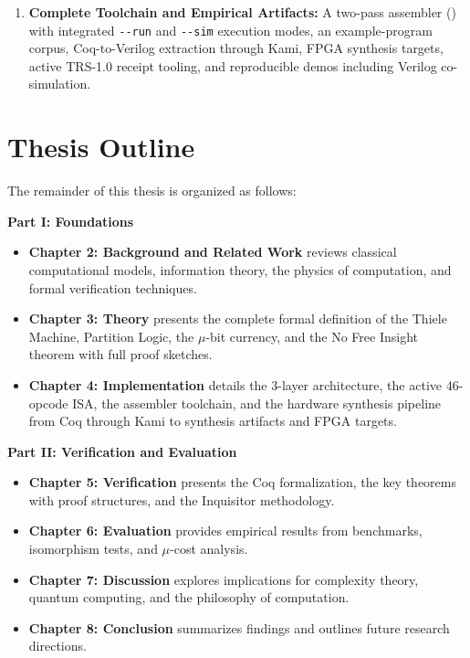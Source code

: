 \begin{enumerate}
    \item \textbf{Complete Toolchain and Empirical Artifacts:} A two-pass assembler () with integrated \texttt{-{}-run} and \texttt{-{}-sim} execution modes, an example-program corpus, Coq-to-Verilog extraction through Kami, FPGA synthesis targets, active TRS-1.0 receipt tooling, and reproducible demos including Verilog co-simulation.
\end{enumerate}

\section{Thesis Outline}

The remainder of this thesis is organized as follows:

\textbf{Part I: Foundations}
\begin{itemize}
    \item \textbf{Chapter 2: Background and Related Work} reviews classical computational models, information theory, the physics of computation, and formal verification techniques.

    \item \textbf{Chapter 3: Theory} presents the complete formal definition of the Thiele Machine, Partition Logic, the $\mu$-bit currency, and the No Free Insight theorem with full proof sketches.

    \item \textbf{Chapter 4: Implementation} details the 3-layer architecture, the active 46-opcode ISA, the assembler toolchain, and the hardware synthesis pipeline from Coq through Kami to synthesis artifacts and FPGA targets.
\end{itemize}

\textbf{Part II: Verification and Evaluation}
\begin{itemize}
    \item \textbf{Chapter 5: Verification} presents the Coq formalization, the key theorems with proof structures, and the Inquisitor methodology.

    \item \textbf{Chapter 6: Evaluation} provides empirical results from benchmarks, isomorphism tests, and $\mu$-cost analysis.

    \item \textbf{Chapter 7: Discussion} explores implications for complexity theory, quantum computing, and the philosophy of computation.

    \item \textbf{Chapter 8: Conclusion} summarizes findings and outlines future research directions.
\end{itemize}

